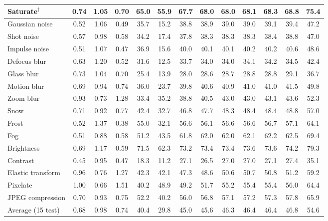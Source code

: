\begin{table}[t]
\begin{tabular}{l|ccc|cc|cc|ccccc}
        Saturate$^\dagger$ & 0.74 & 1.05 & 0.70 & 65.0 & 55.9 & 67.7 & 68.0 & 68.0 & 68.1 & 68.3 & 68.8 & 75.4 \\
        \midrule
        Gaussian noise & 0.52 & 1.06 & 0.49 & 35.7 & 15.2 & 38.8 & 38.9 & 39.0 & 39.0 & 39.1 & 39.4 & 47.2 \\
        Shot noise & 0.57 & 0.98 & 0.58 & 34.2 & 17.4 & 37.8 & 38.3 & 38.3 & 38.3 & 38.4 & 38.8 & 47.0 \\
        Impulse noise & 0.51 & 1.07 & 0.47 & 36.9 & 15.6 & 40.0 & 40.1 & 40.1 & 40.2 & 40.2 & 40.6 & 48.6 \\
        Defocus blur & 0.63 & 1.20 & 0.52 & 31.6 & 12.5 & 33.7 & 34.0 & 34.0 & 34.1 & 34.2 & 34.5 & 42.4 \\
        Glass blur & 0.73 & 1.04 & 0.70 & 25.4 & 13.9 & 28.0 & 28.6 & 28.7 & 28.8 & 28.8 & 29.1 & 36.7 \\
        Motion blur & 0.69 & 0.94 & 0.74 & 36.0 & 23.7 & 39.8 & 40.6 & 40.9 & 41.0 & 41.0 & 41.5 & 49.8 \\
        Zoom blur & 0.93 & 0.73 & 1.28 & 33.4 & 35.2 & 38.8 & 40.5 & 43.0 & 43.0 & 43.1 & 43.6 & 52.3 \\
        Snow & 0.71 & 0.92 & 0.77 & 42.4 & 32.7 & 46.8 & 47.7 & 48.3 & 48.4 & 48.4 & 48.8 & 57.0 \\
        Frost & 0.52 & 1.37 & 0.38 & 55.0 & 32.1 & 56.6 & 56.1 & 56.6 & 56.6 & 56.7 & 57.1 & 64.1 \\
        Fog & 0.51 & 0.88 & 0.58 & 51.2 & 43.5 & 61.8 & 62.0 & 62.0 & 62.1 & 62.2 & 62.5 & 69.4 \\
        Brightness & 0.69 & 1.17 & 0.59 & 71.5 & 62.3 & 73.2 & 73.4 & 73.4 & 73.6 & 73.6 & 74.2 & 79.3 \\
        Contrast & 0.45 & 0.95 & 0.47 & 18.3 & 11.2 & 27.1 & 26.5 & 27.0 & 27.0 & 27.1 & 27.4 & 35.1 \\
        Elastic transform & 0.96 & 0.76 & 1.27 & 42.3 & 42.1 & 47.3 & 48.6 & 50.6 & 50.7 & 50.8 & 51.2 & 59.2 \\
        Pixelate & 1.00 & 0.66 & 1.51 & 40.2 & 48.9 & 49.2 & 51.7 & 55.2 & 55.4 & 55.4 & 56.0 & 64.4 \\
        JPEG compression & 0.70 & 0.93 & 0.75 & 52.2 & 40.2 & 56.0 & 56.8 & 57.1 & 57.2 & 57.3 & 57.8 & 65.9 \\
        \midrule
        Average (15 test) & 0.68 & 0.98 & 0.74 & 40.4 & 29.8 & 45.0 & 45.6 & 46.3 & 46.4 & 46.4 & 46.8 & 54.6 \\
        \bottomrule
    \end{tabular}
\end{table}
